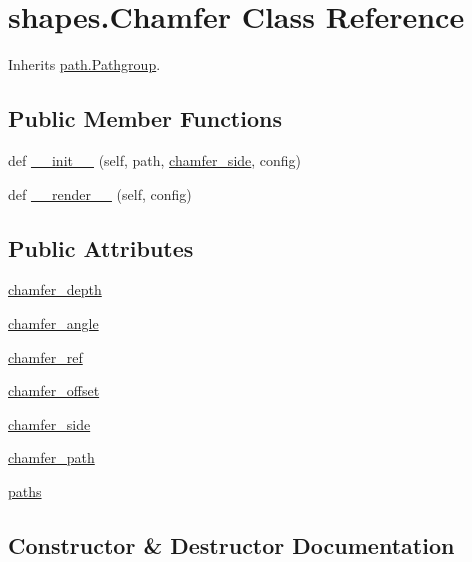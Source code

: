 \hypertarget{classshapes_1_1_chamfer}{}\section{shapes.\+Chamfer Class Reference}
\label{classshapes_1_1_chamfer}


Inherits \hyperlink{classpath_1_1_pathgroup}{path.\+Pathgroup}.

\subsection*{Public Member Functions}
\begin{DoxyCompactItemize}
\item 
def \hyperlink{classshapes_1_1_chamfer_a8e13e08fa6e1662f89e8007f3c5cfad2}{\+\_\+\+\_\+init\+\_\+\+\_\+} (self, path, \hyperlink{classshapes_1_1_chamfer_a87369a36f82b7c0254095aeaf9d10f31}{chamfer\+\_\+side}, config)
\item 
def \hyperlink{classshapes_1_1_chamfer_ac15e1dda4622f72736e41f9a30bd10f6}{\+\_\+\+\_\+render\+\_\+\+\_\+} (self, config)
\end{DoxyCompactItemize}
\subsection*{Public Attributes}
\begin{DoxyCompactItemize}
\item 
\hyperlink{classshapes_1_1_chamfer_ac22786a11a48e4c2a0bbb61f70eb3c9c}{chamfer\+\_\+depth}
\item 
\hyperlink{classshapes_1_1_chamfer_a5348ee0df977ba38a18e1c2c52ad513a}{chamfer\+\_\+angle}
\item 
\hyperlink{classshapes_1_1_chamfer_a063a25fec7b9faf40b503047f7a8c2aa}{chamfer\+\_\+ref}
\item 
\hyperlink{classshapes_1_1_chamfer_a13155ac3a73d871f9529dedf9ff764eb}{chamfer\+\_\+offset}
\item 
\hyperlink{classshapes_1_1_chamfer_a87369a36f82b7c0254095aeaf9d10f31}{chamfer\+\_\+side}
\item 
\hyperlink{classshapes_1_1_chamfer_a91ff7699762a25352033fc3302ec7cd1}{chamfer\+\_\+path}
\item 
\hyperlink{classshapes_1_1_chamfer_a77feca7b13c20722c7fecedc6a5536aa}{paths}
\end{DoxyCompactItemize}


\subsection{Constructor \& Destructor Documentation}
\hypertarget{classshapes_1_1_chamfer_a8e13e08fa6e1662f89e8007f3c5cfad2}{}
